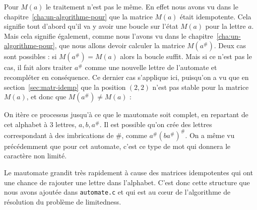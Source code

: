 \documentclass[12pt]{memoir}
\begin{document}
Pour $M(a)$ le traitement n'est pas le même. En effet nous avons vu dans le
chapitre~\ref{cha:un-algorithme-pour} que la matrice $M(a)$ était idempotente. Cela signifie tout d'abord
qu'il va y avoir une boucle sur l'état $M(a)$ pour la lettre $a$. Mais cela
signifie également, comme nous l'avons vu dans le
chapitre~\ref{cha:un-algorithme-pour}, que nous allons devoir calculer la
matrice $M(a^{\#})$. Deux cas sont possibles : si $M(a^{\#}) = M(a)$ alors la
boucle suffit. Mais si ce n'est pas le cas, il fait alors traiter $a^{\#}$
comme une nouvelle lettre de l'automate et recompléter en conséquence. Ce
dernier cas s'applique ici, puisqu'on a vu que en section~\ref{sec:matr-idemp}
 que la position $(2,2)$ n'est pas stable pour la matrice $M(a)$, et donc que $M(a^\#)\not=M(a)$ : 

\begin{center}
\end{center}
$\ $\\


On itère ce processus jusqu'à ce que le mautomate soit complet, en repartant
de cet alphabet à 3 lettres, $a, b, a^\#$. Il est possible qu'on crée des
lettres correspondant à des imbrications de $\#$, comme $a^\#(ba^\#)^\#$. On a
même vu précédemment que pour cet automate, c'est ce type de mot qui donnera
le caractère non limité.

Le mautomate grandit très rapidement à cause des matrices idempotentes qui ont
une chance de rajouter une lettre dans l'alphabet. C'est donc cette structure
que nous avons ajoutée dans \texttt{automate.c} et qui est au c\oe{}ur de l'algorithme de résolution du problème de limitedness.\\
\end{document}
